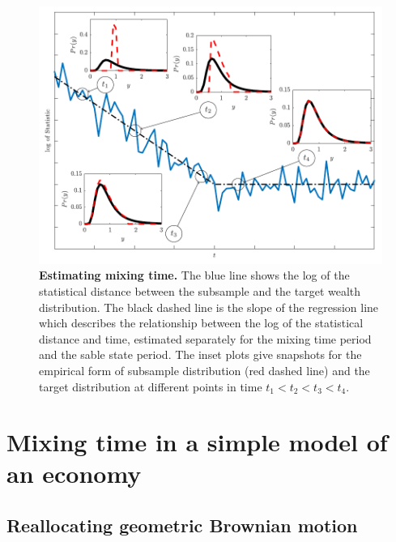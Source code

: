 \documentclass[11pt]{article}
\numberwithin{equation}{section}
\begin{document}
\begin{figure}[!htb]
\centering
\includegraphics[width=1.0\textwidth]{figs/fig_mixing_time.pdf}
\caption{\textbf{Estimating mixing time.} The blue line shows the log of the statistical distance between the subsample and the target wealth distribution. The black dashed line is the slope of the regression line which describes the relationship between the log of the statistical distance and time, estimated separately for the mixing time period and the sable state period. The inset plots give snapshots for the empirical form of subsample distribution (red dashed line) and the target distribution at different points in time $t_1 < t_2 < t_3 < t_4$.  %
\label{fig:mixing-time}}
\end{figure}
\FloatBarrier

\section{Mixing time in a simple model of an economy}\label{sec:rgbm}
\subsection{Reallocating geometric Brownian motion}
\end{document}
